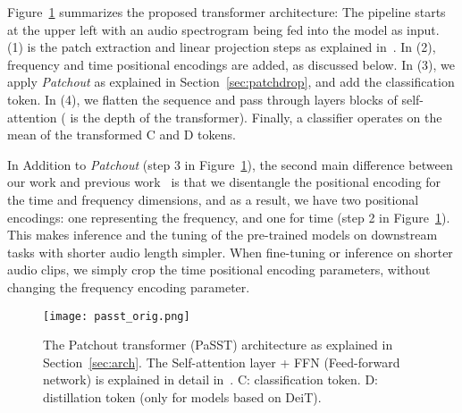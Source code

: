 \documentclass[a4paper]{article}
\begin{document}
Figure~\ref{fig:passt:arch} summarizes the proposed transformer architecture: The pipeline starts at the upper left with an audio spectrogram being fed into the model as input. (1) is the patch extraction and linear projection steps as explained in~\cite{dosovitskiyB0WZ21VIT}. In (2), frequency and time positional encodings are added, as discussed below. In (3), we apply \emph{Patchout} as explained in Section~\ref{sec:patchdrop}, and add the classification token. In (4), we flatten the sequence and pass through  layers blocks of self-attention ( is the depth of the transformer). Finally, a classifier operates on the mean of the transformed C and D tokens.

In Addition to  \emph{Patchout} (step 3 in Figure~\ref{fig:passt:arch}), the second main difference between our work and previous work~\cite{dosovitskiyB0WZ21VIT,TouvronCDMSJ21deit,gong21ast} is that we disentangle the positional encoding for the time and frequency dimensions, and as a result, we have two positional encodings: one representing the frequency, and one for time (step 2 in Figure~\ref{fig:passt:arch}). This makes inference and the tuning of the pre-trained models on downstream tasks with shorter audio length simpler.
When fine-tuning or inference on shorter audio clips, we simply crop the time positional encoding parameters, without changing the frequency encoding parameter.


\begin{figure}[htb]
\centerline{\texttt{[image: passt\_orig.png]}}
\caption{The Patchout transformer (PaSST) architecture as explained in Section~\ref{sec:arch}. The Self-attention layer + FFN (Feed-forward network) is explained in detail in~\cite{dosovitskiyB0WZ21VIT}. C: classification token. D: distillation token (only for models based on DeiT). }
\label{fig:passt:arch}
\end{figure}
\end{document}
